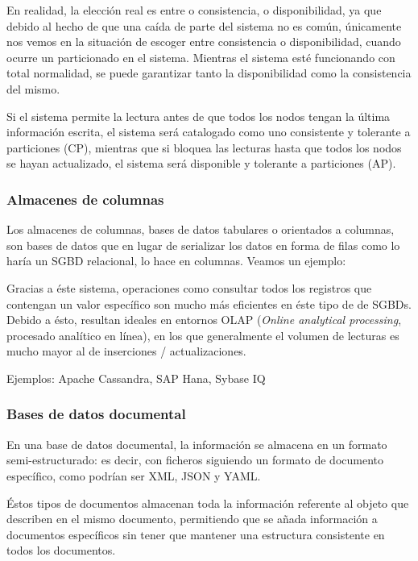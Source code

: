 En realidad, la elección real es entre o consistencia, o disponibilidad, ya que
debido al hecho de que una caída de parte del sistema no es común, únicamente
nos vemos en la situación de escoger entre consistencia o disponibilidad, cuando
ocurre un particionado en el sistema. Mientras el sistema esté funcionando con
total normalidad, se puede garantizar tanto la disponibilidad como la
consistencia del mismo.

Si el sistema permite la lectura antes de que todos los nodos tengan la última
información escrita, el sistema será catalogado como uno consistente y
tolerante a particiones (CP), mientras que si bloquea las lecturas hasta que
todos los nodos se hayan actualizado, el sistema será disponible y tolerante a
particiones (AP).

\subsubsection{Almacenes de columnas}
\label{subsubsec:state_NoSQL_types_column}

Los almacenes de columnas, bases de datos tabulares o orientados a columnas, son
bases de datos que en lugar de serializar los datos en forma de filas como lo
haría un SGBD relacional, lo hace en columnas. Veamos un ejemplo:

Gracias a éste sistema, operaciones como consultar todos los registros que contengan
un valor específico son mucho más eficientes en éste tipo de de SGBDs. Debido a
ésto, resultan ideales en entornos OLAP (\emph{Online analytical processing},
procesado analítico en línea), en los que generalmente el volumen de lecturas
es mucho mayor al de inserciones / actualizaciones.

Ejemplos: Apache Cassandra, SAP Hana, Sybase IQ

\subsubsection{Bases de datos documental}
\label{subsubsec:state_NoSQL_types_doc}

En una base de datos documental, la información se almacena en un formato
semi-estructurado: es decir, con ficheros siguiendo un formato de documento
específico, como podrían ser XML, JSON y YAML.

Éstos tipos de documentos almacenan toda la información referente al objeto que
describen en el mismo documento, permitiendo que se añada información a
documentos específicos sin tener que mantener una estructura consistente en
todos los documentos.


